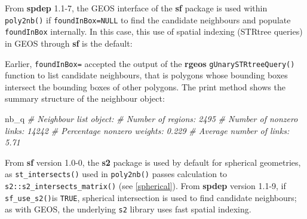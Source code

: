 \documentclass[]{book}
\newenvironment{Shaded}{\begin{snugshade}}{\end{snugshade}}
\newcommand{\CommentTok}[1]{\textcolor[rgb]{0.56,0.35,0.01}{\textit{#1}}}
\newcommand{\DataTypeTok}[1]{\textcolor[rgb]{0.13,0.29,0.53}{#1}}
\newcommand{\KeywordTok}[1]{\textcolor[rgb]{0.13,0.29,0.53}{\textbf{#1}}}
\newcommand{\NormalTok}[1]{#1}
\newcommand{\OperatorTok}[1]{\textcolor[rgb]{0.81,0.36,0.00}{\textbf{#1}}}
\newcommand{\OtherTok}[1]{\textcolor[rgb]{0.56,0.35,0.01}{#1}}
\newcommand{\StringTok}[1]{\textcolor[rgb]{0.31,0.60,0.02}{#1}}
\begin{document}
\begin{Shaded}
\end{Shaded}

From \textbf{spdep} 1.1-7, the GEOS interface of the \textbf{sf} package is used within \texttt{poly2nb()} if \texttt{foundInBox=NULL} to find the candidate neighbours and populate \texttt{foundInBox} internally. In this case, this use of spatial indexing (STRtree queries) in GEOS through \textbf{sf} is the default:

\begin{Shaded}
\end{Shaded}

Earlier, \texttt{foundInBox=} accepted the output of the \textbf{rgeos} \texttt{gUnarySTRtreeQuery()} function to list candidate neighbours, that is polygons whose bounding boxes intersect the bounding boxes of other polygons. The print method shows the summary structure of the neighbour object:

\begin{Shaded}
\begin{Highlighting}[]
\NormalTok{nb_q}
\CommentTok{# Neighbour list object:}
\CommentTok{# Number of regions: 2495 }
\CommentTok{# Number of nonzero links: 14242 }
\CommentTok{# Percentage nonzero weights: 0.229 }
\CommentTok{# Average number of links: 5.71}
\end{Highlighting}
\end{Shaded}

From \textbf{sf} version 1.0-0, the \textbf{s2} package \citep{R-s2} is used by default for spherical geometries, as \texttt{st\_intersects()} used in \texttt{poly2nb()} passes calculation to \texttt{s2::s2\_intersects\_matrix()} (see \ref{spherical}). From \textbf{spdep} version 1.1-9, if \texttt{sf\_use\_s2()}is \texttt{TRUE}, spherical intersection is used to find candidate neighbours; as with GEOS, the underlying \texttt{s2} library uses fast spatial indexing.
\end{document}
